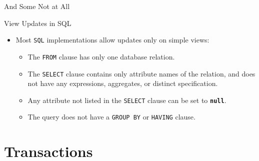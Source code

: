 \documentclass[aspectratio=169]{beamer}
\begin{document}
\begin{frame}[fragile]{And Some Not at All}
\end{frame}

\begin{frame}{View Updates in SQL}
    \begin{itemize}
        \item Most \texttt{SQL} implementations allow updates only on simple views:
        \begin{itemize}
            \item The \texttt{FROM} clause has only one database relation.
            \item The \texttt{SELECT} clause contains only attribute names of the relation, and does not have any expressions, aggregates, or distinct specification.
            \item Any attribute not listed in the \texttt{SELECT} clause can be set to \texttt{\textbf{null}}.
            \item The query does not have a \texttt{GROUP BY} or \texttt{HAVING} clause.
        \end{itemize}
    \end{itemize}
\end{frame}

\section{Transactions}
\end{document}
